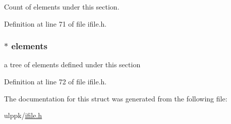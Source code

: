 Count of elements under this section. 



Definition at line 71 of file ifile.\-h.

\hypertarget{struct_i_f___s_e_c_t_i_o_n___n_o_d_e_acc1e310201bdd586432fffda63f2f863}{
\subsubsection[{elements}]{$\ast$ elements}}\label{struct_i_f___s_e_c_t_i_o_n___n_o_d_e_acc1e310201bdd586432fffda63f2f863}


a tree of elements defined under this section 



Definition at line 72 of file ifile.\-h.



The documentation for this struct was generated from the following file\-:\begin{DoxyCompactItemize}
\item 
ulppk/\hyperlink{ifile_8h}{ifile.\-h}\end{DoxyCompactItemize}
